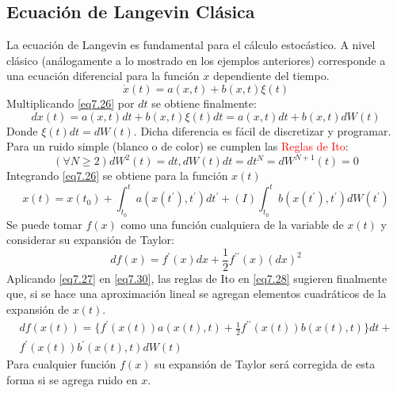 \documentclass{book}
\begin{document}
\subsection{Ecuación de Langevin Clásica}
La ecuación de Langevin es fundamental para el cálculo estocástico. A nivel clásico (análogamente a lo mostrado en los ejemplos anteriores) corresponde a una ecuación diferencial para la función $x$ dependiente del tiempo.
\begin{equation}\label{eq7.26}\dot{x}(t)=a(x,t)+b(x,t)\xi(t)\end{equation}
Multiplicando \ref{eq7.26} por $dt$ se obtiene finalmente:
\begin{equation}\label{eq7.27}dx(t)=a(x,t)dt+b(x,t)\xi(t)dt=a(x,t)dt+b(x,t)dW(t)\end{equation}
Donde $\xi(t)dt=dW(t)$. Dicha diferencia es fácil de discretizar y programar. Para un ruido simple (blanco o de color) se cumplen las \textcolor{red}{Reglas de Ito}:
\begin{equation}\label{eq7.28}(\forall N\geq 2)dW^2(t)=dt, dW(t)dt=dt^N=dW^{N+1}(t)=0 \end{equation}
Integrando \ref{eq7.26} se obtiene para la función $x(t)$
\begin{equation}\label{eq7.29}x(t)=x(t_0)+\int_{t_0}^t a(x(t^\prime),t^\prime) dt^\prime +(I)\int_{t_0}^t b(x(t^\prime),t^\prime)dW(t^\prime)\end{equation}
Se puede tomar $f(x)$ como una función cualquiera de la variable de $x(t)$ y considerar su expansión de Taylor:
\begin{equation}\label{eq7.30}df(x)=f^\prime(x)dx+\frac{1}{2}f^{\prime\prime}(x)(dx)^2\end{equation}
Aplicando \ref{eq7.27} en \ref{eq7.30}, las reglas de Ito en \ref{eq7.28} sugieren finalmente que, si se hace una aproximación lineal se agregan elementos cuadráticos de la expansión de $x(t)$.
\begin{equation}\begin{aligned}\label{eq7.31}df(x(t))=\{f^\prime(x(t))a(x(t),t)+\frac{1}{2}f^{\prime\prime}(x(t))b(x(t),t)\}dt+ \\f^\prime(x(t))b^\prime(x(t),t)dW(t)\end{aligned}\end{equation}
Para cualquier función $f(x)$ su expansión de Taylor será corregida de esta forma si se agrega ruido en $x$.
\end{document}
